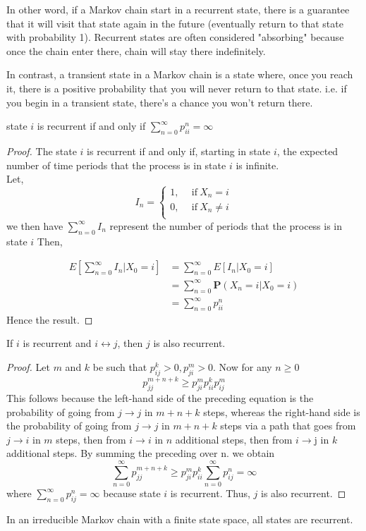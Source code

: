 In other word, if a Markov chain start in a recurrent state, there is a guarantee that it will visit that state again in the future
(eventually return to that state with probability 1). Recurrent states are often considered "absorbing" 
because once the chain enter there, chain will stay there indefinitely.

In contrast, a transient state in a Markov chain is a state where, once you reach it, 
there is a positive probability that you will never return to that state.
i.e. if you begin in a transient state, there's a chance you won't return there.

\begin{corollary}
    \label{recurrent}
    state $ i $ is recurrent if and only if  $ \sum_{n=0}^{\infty} p^{n}_{ii}=\infty $
\end{corollary}
\begin{proof}
    The state $ i $ is recurrent if and only if, starting in state  $ i $, the expected number of time periods that the 
    process is in state  $ i $ is infinite. \\ 
    Let, 
    \[
        I_{n} =
        \begin{cases}
            1, \ \ &\text{if}\ X_{n} = i\\ 
            0, \ \ &\text{if}\ X_{n} \neq  i\\ 
        \end{cases}
    \]
    we then have $ \sum_{n=0}^{\infty} I_{n} $ represent the number of periods that the process is in state $ i $ Then,

    \begin{align*}
        E\left[\sum_{n=0}^{\infty} I_{n}|X_{0}=i\right]&= \sum_{n=0}^{\infty} E[I_{n}|X_{0}=i] \\
        &= \sum_{n=0}^{\infty} \mathbf{P}(X_{n}=i|X_{0}=i) \\
        &= \sum_{n=0}^{\infty} p^{n}_{ii} 
    \end{align*}
    Hence the result.
\end{proof}

\begin{theorem}[]
    \label{recurent if communicate}
    If $ i $ is recurrent and $ i\longleftrightarrow j $, then  $ j $ is also recurrent.
\end{theorem}
\begin{proof}
    Let $ m $ and  $ k $ be such that  $ p^{k}_{ij}>0,p^{m}_{ji}>0 $. Now for any $ n\ge 0 $
    \[
        p^{m+n+k}_{jj}\ge p^{m}_{ji}p^{k}_{ii}p^{m}_{ij}
    \]
    This follows because the left-hand side of the preceding equation is the probability of going from $j \to j$ in $m+n+k$ steps, 
    whereas the right-hand side is the probability of going from $j \to j$ in $m+n+k$ steps 
    via a path that goes from $j \to i$ in $m$ steps, then from $i \to i$ in $n$ additional steps, 
    then from $i \to $j in $k$ additional steps. By summing the preceding over n. we obtain
    \[
        \sum_{n=0}^{\infty} p^{m+n+k}_{jj}\ge p^{m}_{ji}p^{k}_{ii} \sum_{n=0}^{\infty}  p^{n}_{ij} = \infty
    \]
     where $ \sum_{n=0}^{\infty}  p^{n}_{ij} = \infty $ because state $ i $ is recurrent. Thus, $j$ is also recurrent.
\end{proof}

\begin{proposition}
     In an irreducible Markov chain with a finite state space, all states are recurrent.
\end{proposition}
